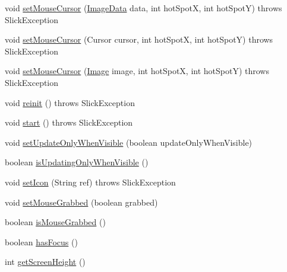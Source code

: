 \begin{DoxyCompactItemize}
\item 
void \mbox{\hyperlink{classorg_1_1newdawn_1_1slick_1_1_app_game_container_a0a3007de6c5bf445fb3abc82f9da2832}{set\+Mouse\+Cursor}} (\mbox{\hyperlink{interfaceorg_1_1newdawn_1_1slick_1_1opengl_1_1_image_data}{Image\+Data}} data, int hot\+SpotX, int hot\+SpotY)  throws Slick\+Exception 
\item 
void \mbox{\hyperlink{classorg_1_1newdawn_1_1slick_1_1_app_game_container_a70afe6f383739a5607c145a9fd193c26}{set\+Mouse\+Cursor}} (Cursor cursor, int hot\+SpotX, int hot\+SpotY)  throws Slick\+Exception 
\item 
void \mbox{\hyperlink{classorg_1_1newdawn_1_1slick_1_1_app_game_container_a714758b8650cd08fd982b81d29a173a0}{set\+Mouse\+Cursor}} (\mbox{\hyperlink{classorg_1_1newdawn_1_1slick_1_1_image}{Image}} image, int hot\+SpotX, int hot\+SpotY)  throws Slick\+Exception 
\item 
void \mbox{\hyperlink{classorg_1_1newdawn_1_1slick_1_1_app_game_container_a1b0b230965ebebc9d4f43acf93986fd3}{reinit}} ()  throws Slick\+Exception 
\item 
void \mbox{\hyperlink{classorg_1_1newdawn_1_1slick_1_1_app_game_container_adcadc0e560e64d03be24c817931fdd54}{start}} ()  throws Slick\+Exception 
\item 
void \mbox{\hyperlink{classorg_1_1newdawn_1_1slick_1_1_app_game_container_a910d70d918cbefb4226d40c4b5b71de1}{set\+Update\+Only\+When\+Visible}} (boolean update\+Only\+When\+Visible)
\item 
boolean \mbox{\hyperlink{classorg_1_1newdawn_1_1slick_1_1_app_game_container_a7170572186df9d087212af752d6056f5}{is\+Updating\+Only\+When\+Visible}} ()
\item 
void \mbox{\hyperlink{classorg_1_1newdawn_1_1slick_1_1_app_game_container_a9e23ed4e8586f6ab9ef28487a595ce12}{set\+Icon}} (String ref)  throws Slick\+Exception 
\item 
void \mbox{\hyperlink{classorg_1_1newdawn_1_1slick_1_1_app_game_container_a526b149913ec344cf7b34043d5dd126c}{set\+Mouse\+Grabbed}} (boolean grabbed)
\item 
boolean \mbox{\hyperlink{classorg_1_1newdawn_1_1slick_1_1_app_game_container_a708f34691e46d211850a1e56a7589984}{is\+Mouse\+Grabbed}} ()
\item 
boolean \mbox{\hyperlink{classorg_1_1newdawn_1_1slick_1_1_app_game_container_a6f2465b04f3d5d08cd18b4b136fe2f46}{has\+Focus}} ()
\item 
int \mbox{\hyperlink{classorg_1_1newdawn_1_1slick_1_1_app_game_container_add722e9c1f0175f77e41cea0d65c8e90}{get\+Screen\+Height}} ()

\end{DoxyCompactItemize}
